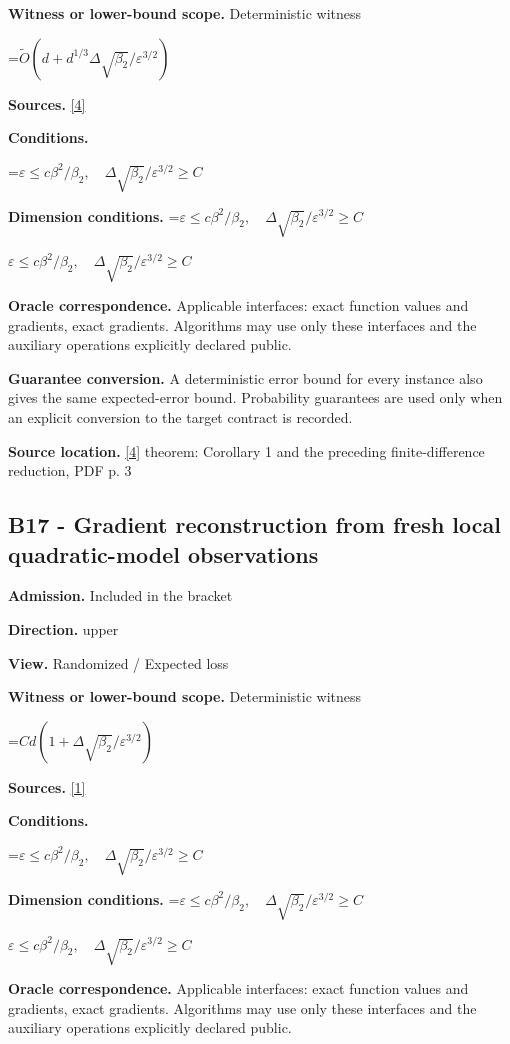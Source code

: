 \documentclass[10pt,a4paper]{article}
\newcommand{\AtlasMath}[1]{\par\begingroup\centering\setbox0=\hbox{$\displaystyle #1$}\ifdim\wd0>1.4\linewidth\typeout{ATLAS WIDE FORMULA: \the\wd0}\fi\ifdim\wd0>\linewidth\resizebox{\linewidth}{!}{\box0}\else\box0\fi\par\endgroup}
\newcommand{\AtlasInlineMath}[1]{\begingroup\setbox0=\hbox{$#1$}\ifdim\wd0>.4\linewidth\endgroup\AtlasMath{#1}\else\endgroup$#1$\fi}
\begin{document}
\textbf{Witness or lower-bound scope.} Deterministic witness

\AtlasMath{\widetilde{O}(d+d^{1/3}\Delta\sqrt{\beta_2}/\varepsilon^{3/2})}
\textbf{Sources.} \href{https://arxiv.org/pdf/2510.20786}{[4]}

\textbf{Conditions.} 
\AtlasMath{\varepsilon\le c\beta^2/\beta_2,\quad\Delta\sqrt{\beta_2}/\varepsilon^{3/2}\ge C}


\textbf{Dimension conditions.} \AtlasInlineMath{\varepsilon\le c\beta^2/\beta_2,\quad\Delta\sqrt{\beta_2}/\varepsilon^{3/2}\ge C}

\textbf{Oracle correspondence.} Applicable interfaces: exact function values and gradients, exact gradients. Algorithms may use only these interfaces and the auxiliary operations explicitly declared public.

\textbf{Guarantee conversion.} A deterministic error bound for every instance also gives the same expected-error bound. Probability guarantees are used only when an explicit conversion to the target contract is recorded.

\textbf{Source location.} \href{https://arxiv.org/pdf/2510.20786}{[4]} theorem: Corollary 1 and the preceding finite-difference reduction, PDF p. 3

\subsection{B17 - Gradient reconstruction from fresh local quadratic-model observations}
\textbf{Admission.} Included in the bracket

\textbf{Direction.} upper

\textbf{View.} Randomized / Expected loss

\textbf{Witness or lower-bound scope.} Deterministic witness

\AtlasMath{Cd(1+\Delta\sqrt{\beta_2}/\varepsilon^{3/2})}
\textbf{Sources.} \href{https://arxiv.org/pdf/2610.02791}{[1]}

\textbf{Conditions.} 
\AtlasMath{\varepsilon\le c\beta^2/\beta_2,\quad\Delta\sqrt{\beta_2}/\varepsilon^{3/2}\ge C}


\textbf{Dimension conditions.} \AtlasInlineMath{\varepsilon\le c\beta^2/\beta_2,\quad\Delta\sqrt{\beta_2}/\varepsilon^{3/2}\ge C}

\textbf{Oracle correspondence.} Applicable interfaces: exact function values and gradients, exact gradients. Algorithms may use only these interfaces and the auxiliary operations explicitly declared public.
\end{document}
